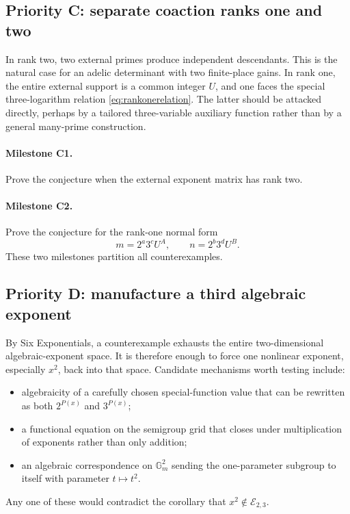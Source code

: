 \documentclass[11pt,oneside]{article}
\theoremstyle{definition}
\newcommand{\Espace}{\mathscr E_{2,3}}
\begin{document}
\subsection{Priority C: separate coaction ranks one and two}

In rank two, two external primes produce independent descendants.  This is the natural case for an adelic determinant with two finite-place gains.  In rank one, the entire external support is a common integer $U$, and one faces the special three-logarithm relation \eqref{eq:rankonerelation}.  The latter should be attacked directly, perhaps by a tailored three-variable auxiliary function rather than by a general many-prime construction.

\paragraph{Milestone C1.}
Prove the conjecture when the external exponent matrix has rank two.

\paragraph{Milestone C2.}
Prove the conjecture for the rank-one normal form
\[
 m=2^a3^cU^A,
 \qquad
 n=2^b3^dU^B.
\]
These two milestones partition all counterexamples.

\subsection{Priority D: manufacture a third algebraic exponent}

By Six Exponentials, a counterexample exhausts the entire two-dimensional algebraic-exponent space.  It is therefore enough to force one nonlinear exponent, especially $x^2$, back into that space.  Candidate mechanisms worth testing include:
\begin{itemize}
\item algebraicity of a carefully chosen special-function value that can be rewritten as both $2^{P(x)}$ and $3^{P(x)}$;
\item a functional equation on the semigroup grid that closes under multiplication of exponents rather than only addition;
\item an algebraic correspondence on $\mathbb G_m^2$ sending the one-parameter subgroup to itself with parameter $t\mapsto t^2$.
\end{itemize}
Any one of these would contradict the corollary that $x^2\notin\Espace$.
\end{document}
